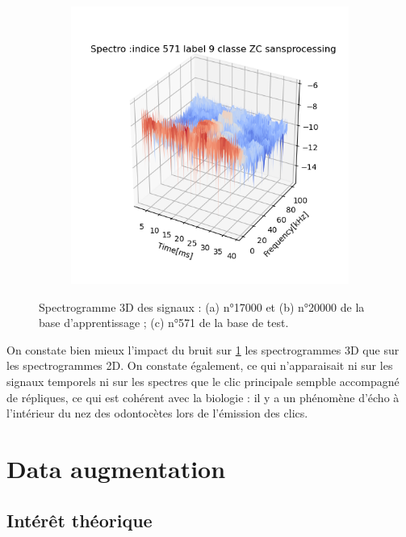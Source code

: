 \begin{figure}[!h]
\begin{subfigure}[b]{0.3\textwidth}
        \caption{}
  \end{subfigure}
  \begin{subfigure}[b]{0.3\textwidth}
    \includegraphics[width=\textwidth]{./images/indice571Spectro3Dlabel9classeZCsansprocessingsanszoom.png}
        \caption{}
  \end{subfigure}
  \caption{Spectrogramme 3D des signaux : (a) n°17000 et (b) n°20000 de la base d'apprentissage ; (c) n°571 de la base de test.%
	\label{fig:spectros3D}}
\end{figure}

On constate bien mieux l'impact du bruit sur \ref{fig:spectros3D} les spectrogrammes 3D que sur les spectrogrammes 2D.
On constate également, ce qui n'apparaisait ni sur les signaux temporels ni sur les spectres que le clic principale sempble accompagné de répliques, ce qui est cohérent avec la biologie : il y a un phénomène d'écho à l'intérieur du nez des odontocètes lors de l'émission des clics.

\hypertarget{Data-augmentation}{%
\section{Data augmentation}
\label{Data-augmentation}}

\hypertarget{}{%
\subsection{Intérêt théorique}
\label{interets_theoriques}}

